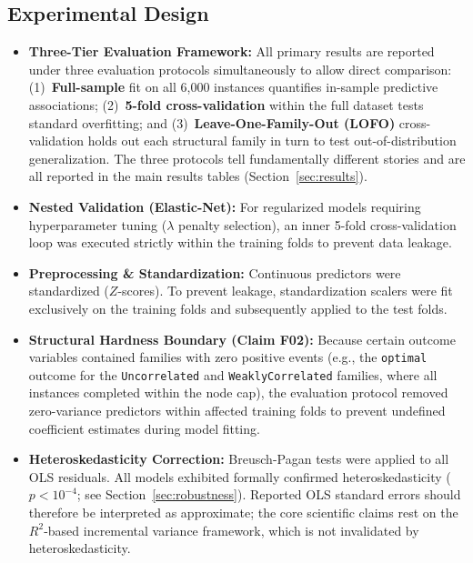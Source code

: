 \documentclass[sigconf]{acmart}
\begin{document}
\subsection{Experimental Design}
\begin{itemize}
  \item \textbf{Three-Tier Evaluation Framework:} All primary results are reported under three evaluation protocols simultaneously to allow direct comparison: (1)~\textbf{Full-sample} fit on all 6,000 instances quantifies in-sample predictive associations; (2)~\textbf{5-fold cross-validation} within the full dataset tests standard overfitting; and (3)~\textbf{Leave-One-Family-Out (LOFO)} cross-validation holds out each structural family in turn to test out-of-distribution generalization. The three protocols tell fundamentally different stories and are all reported in the main results tables (Section~\ref{sec:results}).
  \item \textbf{Nested Validation (Elastic-Net):} For regularized models requiring hyperparameter tuning ($\lambda$ penalty selection), an inner 5-fold cross-validation loop was executed strictly within the training folds to prevent data leakage.
  \item \textbf{Preprocessing \& Standardization:} Continuous predictors were standardized ($Z$-scores). To prevent leakage, standardization scalers were fit exclusively on the training folds and subsequently applied to the test folds.
  \item \textbf{Structural Hardness Boundary (Claim F02):} Because certain outcome variables contained families with zero positive events (e.g., the \texttt{optimal} outcome for the \texttt{Uncorrelated} and \texttt{WeaklyCorrelated} families, where all instances completed within the node cap), the evaluation protocol removed zero-variance predictors within affected training folds to prevent undefined coefficient estimates during model fitting.
  \item \textbf{Heteroskedasticity Correction:} Breusch-Pagan tests were applied to all OLS residuals. All models exhibited formally confirmed heteroskedasticity ($p < 10^{-4}$; see Section~\ref{sec:robustness}). Reported OLS standard errors should therefore be interpreted as approximate; the core scientific claims rest on the $R^2$-based incremental variance framework, which is not invalidated by heteroskedasticity.
\end{itemize}
\end{document}
